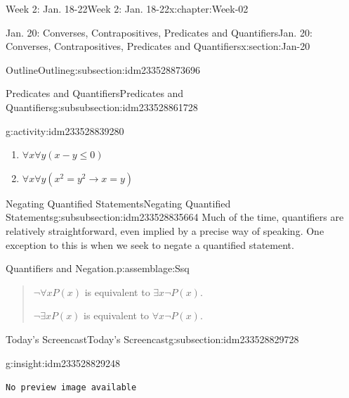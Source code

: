 \documentclass[oneside,10pt,]{book}
\newcommand{\mono}[1]{\texttt{#1}}
\numberwithin{equation}{section}
\newlength{\qrsize}
\newlength{\previewwidth}
\renewcommand{\le}{\leqslant}
\def\imp{\to}
\newcommand{\imp}{\rightarrow}
\begin{document}
\begin{chapterptx}{Week 2: Jan. 18-22}{}{Week 2: Jan. 18-22}{}{}{x:chapter:Week-02}
\begin{sectionptx}{Jan. 20: Converses, Contrapositives, Predicates and Quantifiers}{}{Jan. 20: Converses, Contrapositives, Predicates and Quantifiers}{}{}{x:section:Jan-20}
\begin{subsectionptx}{Outline}{}{Outline}{}{}{g:subsection:idm233528873696}
\begin{subsubsectionptx}{Predicates and Quantifiers}{}{Predicates and Quantifiers}{}{}{g:subsubsection:idm233528861728}
\begin{activity}{}{g:activity:idm233528839280}
\begin{enumerate}
\item{}\(\displaystyle \forall x \forall y (x-y \le 0)\)%
\item{}\(\displaystyle \forall x\forall y(x^2 = y^2 \imp x = y)\)%
\end{enumerate}
\end{activity}%
\end{subsubsectionptx}
%
%
\typeout{************************************************}
\typeout{************************************************}
%
\begin{subsubsectionptx}{Negating Quantified Statements}{}{Negating Quantified Statements}{}{}{g:subsubsection:idm233528835664}
Much of the time, quantifiers are relatively straightforward, even implied by a precise way of speaking. One exception to this is when we seek to negate a quantified statement.%
\begin{assemblage}{Quantifiers and Negation.}{p:assemblage:Ssq}%
\begin{quote}%
\(\neg \forall x P(x)\) is equivalent to \(\exists x \neg P(x)\).%
\par
\(\neg \exists x P(x)\) is equivalent to \(\forall x \neg P(x)\).%
\end{quote}
\end{assemblage}
\end{subsubsectionptx}
\end{subsectionptx}
%
%
\typeout{************************************************}
\typeout{************************************************}
%
\begin{subsectionptx}{Today's Screencast}{}{Today's Screencast}{}{}{g:subsection:idm233528829728}
\begin{insight}{}{g:insight:idm233528829248}%
\setlength{\qrsize}{9em}
\setlength{\previewwidth}{\linewidth}
\addtolength{\previewwidth}{-\qrsize}
\begin{tcbraster}[raster columns=2, raster column skip=1pt, raster halign=center, raster force size=false, raster left skip=0pt, raster right skip=0pt]%
\begin{tcolorbox}[previewstyle, width=\previewwidth]%
\mono{No preview image available}%
\end{tcolorbox}%
\begin{tcolorbox}[qrstyle]%
[QR LINK]\end{tcolorbox}%
\end{tcbraster}%
\end{insight}

\end{subsectionptx}
\end{sectionptx}
\end{chapterptx}
\end{document}
